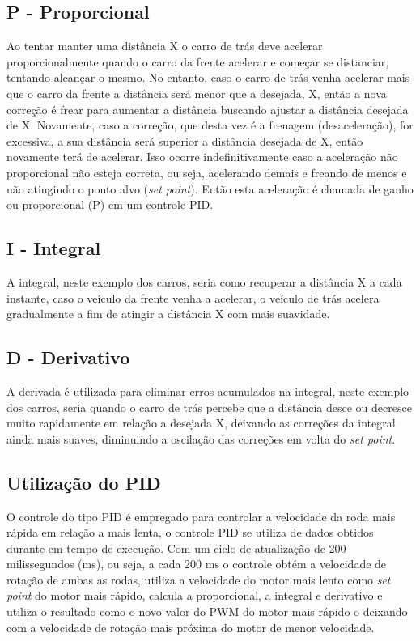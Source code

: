 \documentclass[a4paper,12pt,portuguese]{ufms-cpcx}
\begin{document}
\subsection*{P - Proporcional}
Ao tentar manter uma distância X o carro de trás deve acelerar proporcionalmente quando o carro da frente acelerar e começar se distanciar, tentando alcançar o mesmo. No entanto, caso o carro de trás venha acelerar mais que o carro da frente a distância será menor que a desejada, X, então a nova correção é frear para aumentar a distância buscando ajustar a distância desejada de X. Novamente, caso a correção, que desta vez é a frenagem (desaceleração), for excessiva, a sua distância será superior a distância desejada de X, então novamente terá de acelerar. Isso ocorre indefinitivamente caso a aceleração não proporcional não esteja correta, ou seja, acelerando demais e freando de menos e não atingindo o ponto alvo (\textit{set point}). Então esta aceleração é chamada de ganho ou proporcional (P) em um controle PID.

\subsection*{I - Integral}
A integral, neste exemplo dos carros, seria como recuperar a distância X a cada instante, caso o veículo da frente venha a acelerar, o veículo de trás acelera gradualmente a fim de atingir a distância X com mais suavidade.

\subsection*{D - Derivativo}
A derivada é utilizada para eliminar erros acumulados na integral, neste exemplo dos carros, seria quando o carro de trás percebe que a distância desce ou decresce muito rapidamente em relação a desejada X, deixando as correções da integral ainda mais suaves, diminuindo a oscilação das correções em volta do \textit{set point}.

\subsection{Utilização do PID}
O controle do tipo PID é empregado para controlar a velocidade da roda mais rápida em relação a mais lenta, o controle PID se utiliza de dados obtidos durante em tempo de execução. Com um ciclo de atualização de 200 milissegundos (ms), ou seja, a cada 200 ms o controle obtém a velocidade de rotação de ambas as rodas, utiliza a velocidade do motor mais lento como \textit{set point} do motor mais rápido, calcula a proporcional, a integral e derivativo e utiliza o resultado como o novo valor do PWM do motor mais rápido o deixando com a velocidade de rotação mais próxima do motor de menor velocidade.
\end{document}
